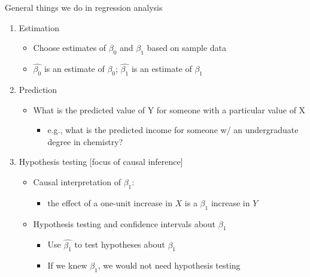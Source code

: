 \begin{frame}{General things we do in regression analysis}
	\begin{enumerate}
	\item Estimation
		\begin{itemize}
		\item Choose estimates of $\beta_{0}$ and $\beta_{1}$ based on sample data
		\item $\hat{\beta_{0}}$ is an estimate of $\beta_{0}$; $\hat{\beta_{1}}$ is an estimate of $\beta_{1}$ 
		\end{itemize}
	\item Prediction
		\begin{itemize}
		\item What is the predicted value of Y for someone with a particular value of X
			\begin{itemize}
			\item e.g., what is the predicted income for someone w/ an undergraduate degree in chemistry?
			\end{itemize}
		\end{itemize}
	\item Hypothesis testing [focus of causal inference]
		\begin{itemize}
		\item  Causal interpretation of $\beta_{1}$:
		\begin{itemize}
			\item  the effect of a one-unit increase in $ X $ is a $\beta_{1}$ increase in $ Y $		
		\end{itemize}
		\item Hypothesis testing and confidence intervals about $\beta_{1}$
		\begin{itemize}
			\item  Use $\hat{\beta_{1}}$ to test hypotheses about $\beta_{1}$
			\item  If we knew $\beta_{1}$, we would not need hypothesis testing
		\end{itemize}


		\end{itemize}
	\end{enumerate}
\end{frame}

